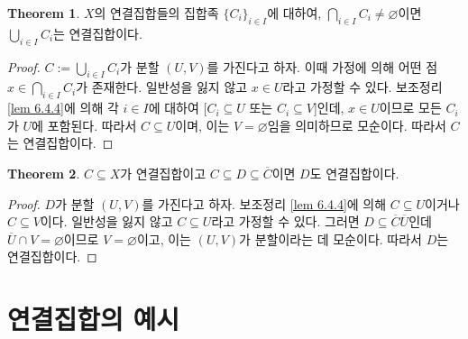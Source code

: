 \documentclass[11pt]{book}
\numberwithin{equation}{chapter}
\theoremstyle{definition}
\newtheorem{thm}{Theorem}[section]
\begin{document}
\begin{thm} \label{thm 6.4.5}
    \(X\)의 연결집합들의 집합족 \(\{C_i\}_{i \in I}\)에 대하여, \(\bigcap_{i \in I} C_i \ne \varnothing\)이면 \(\bigcup_{i \in I} C_i\)는 연결집합이다.
\end{thm}
\begin{proof}
    \(C := \bigcup_{i \in I} C_i\)가 분할 \((U, V)\)를 가진다고 하자. 이때 가정에 의해 어떤 점 \(x \in \bigcap_{i \in I} C_i\)가 존재한다. 일반성을 잃지 않고 \(x \in U\)라고 가정할 수 있다. 보조정리 \ref{lem 6.4.4}에 의해 각 \(i \in I\)에 대하여 [\(C_i \subseteq U\) 또는 \(C_i \subseteq V\)]인데, \(x \in U\)이므로 모든 \(C_i\)가 \(U\)에 포함된다. 따라서 \(C \subseteq U\)이며, 이는 \(V = \varnothing\)임을 의미하므로 모순이다. 따라서 \(C\)는 연결집합이다.
\end{proof}

\begin{thm}
    \(C \subseteq X\)가 연결집합이고 \(C \subseteq D \subseteq \overline{C}\)이면 \(D\)도 연결집합이다.
\end{thm}
\begin{proof}
    \(D\)가 분할 \((U, V)\)를 가진다고 하자. 보조정리 \ref{lem 6.4.4}에 의해 \(C \subseteq U\)이거나 \(C \subseteq V\)이다. 일반성을 잃지 않고 \(C \subseteq U\)라고 가정할 수 있다. 그러면 \(D \subseteq \overline{C} \overline{U}\)인데 \(\overline{U} \cap V = \varnothing\)이므로 \(V = \varnothing\)이고, 이는 \((U, V)\)가 분할이라는 데 모순이다. 따라서 \(D\)는 연결집합이다.
\end{proof}

\section{연결집합의 예시}
\end{document}
